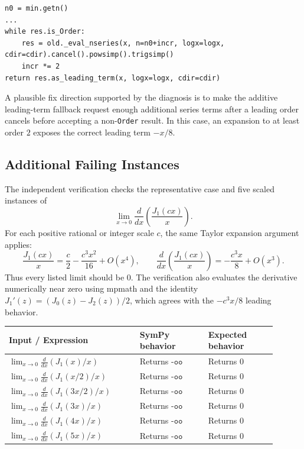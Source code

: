 \documentclass[11pt]{article}
\begin{document}
\begin{lstlisting}[style=bugpython]
n0 = min.getn()
...
while res.is_Order:
    res = old._eval_nseries(x, n=n0+incr, logx=logx, cdir=cdir).cancel().powsimp().trigsimp()
    incr *= 2
return res.as_leading_term(x, logx=logx, cdir=cdir)
\end{lstlisting}

A plausible fix direction supported by the diagnosis is to make the additive
leading-term fallback request enough additional series terms after a leading
order cancels before accepting a non-\texttt{Order} result. In this case, an
expansion to at least order \(2\) exposes the correct leading term \(-x/8\).

\subsection{Additional Failing Instances}

The independent verification checks the representative case and five scaled
instances of
\[
    \lim_{x\to 0}\frac{d}{dx}\left(\frac{J_1(c x)}{x}\right).
\]
For each positive rational or integer scale \(c\), the same Taylor expansion
argument applies:
\[
    \frac{J_1(c x)}{x}
    =\frac{c}{2}-\frac{c^3x^2}{16}+O(x^4),
    \qquad
    \frac{d}{dx}\left(\frac{J_1(c x)}{x}\right)
    =-\frac{c^3x}{8}+O(x^3).
\]
Thus every listed limit should be \(0\). The verification also evaluates the
derivative numerically near zero using mpmath and the identity
\(J_1'(z)=(J_0(z)-J_2(z))/2\), which agrees with the
\(-c^3x/8\) leading behavior.

\begin{center}
\small
\renewcommand{\arraystretch}{1.3}
\begin{tabular}{@{}>{\raggedright\arraybackslash}p{0.44\linewidth}>{\raggedright\arraybackslash}p{0.23\linewidth}>{\raggedright\arraybackslash}p{0.23\linewidth}@{}}
\toprule
\textbf{Input / Expression} & \textbf{SymPy behavior} & \textbf{Expected behavior} \\
\midrule
\(\displaystyle \lim_{x\to0}\frac{d}{dx}\left(J_1(x)/x\right)\) & Returns \(\texttt{-oo}\) & Returns \(0\) \\
\(\displaystyle \lim_{x\to0}\frac{d}{dx}\left(J_1(x/2)/x\right)\) & Returns \(\texttt{-oo}\) & Returns \(0\) \\
\(\displaystyle \lim_{x\to0}\frac{d}{dx}\left(J_1(3x/2)/x\right)\) & Returns \(\texttt{-oo}\) & Returns \(0\) \\
\(\displaystyle \lim_{x\to0}\frac{d}{dx}\left(J_1(3x)/x\right)\) & Returns \(\texttt{-oo}\) & Returns \(0\) \\
\(\displaystyle \lim_{x\to0}\frac{d}{dx}\left(J_1(4x)/x\right)\) & Returns \(\texttt{-oo}\) & Returns \(0\) \\
\(\displaystyle \lim_{x\to0}\frac{d}{dx}\left(J_1(5x)/x\right)\) & Returns \(\texttt{-oo}\) & Returns \(0\) \\
\bottomrule
\end{tabular}
\end{center}
\end{document}

